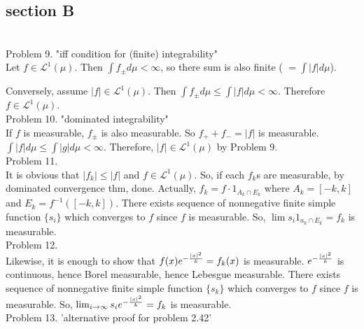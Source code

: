 \subsection*{section B}\hfill \\

Problem 9. "iff condition for (finite) integrability"\\

Let $f\in \mathcal{L}^1(\mu)$. Then $\int f_{\pm} d\mu < \infty$, so there sum is also finite ( $= \int \lvert f \rvert d\mu$).

Conversely, assume $\lvert f \rvert \in \mathcal{L}^1(\mu)$. Then $\int f_{\pm} d\mu \leq \int \lvert f \rvert d\mu < \infty$. Therefore $f \in \mathcal{L}^1(\mu)$.\\

Problem 10. "dominated integrability"\\

If $f$ is measurable, $f_{\pm}$ is also measurable. So $f_+ + f_- = \lvert f \rvert $ is measurable.
$\int \lvert f \rvert d\mu \leq \int \lvert g \rvert d\mu < \infty$. 
Therefore, $\lvert f \rvert \in \mathcal{L}^1(\mu)$ by Problem 9.\\

Problem 11. \\

It is obvious that $ \lvert f_k \rvert \leq \lvert f \rvert$ and $f \in \mathcal{L}^1(\mu)$.
So, if each $f_k$s are measurable, by dominated convergence thm, done.
Actually, $f_k = f \cdot 1_{A_k \cap E_k}$ where $A_k = \left [ -k, k \right ]$ and $E_k = f^{-1} (\left [ -k, k \right])$.
There exists sequence of nonnegative finite simple function $\{s_i\}$ which converges to $f$ since $f$ is measurable.
So, $\lim s_i 1_{a_k \cap E_k} = f_k$ is measurable.\\

Problem 12. \\

Likewise, it is enough to show that $f(x) e^{-{ {\lvert x \rvert}^2 \over k}} = f_k(x)$ is measurable.
$e^{-{ {\lvert x \rvert}^2 \over k}}$ is continuous, hence Borel measurable, hence Lebesgue measurable.
There exists sequence of nonnegative finite simple function $\{s_k \}$ which converges to $f$ since $f$ is measurable.
So, $\lim_{i \rightarrow \infty} s_i e^{-{ {\lvert x \rvert}^2 \over k}} = f_k$ is measurable. \\

Problem 13. 'alternative proof for problem 2.42' \\

